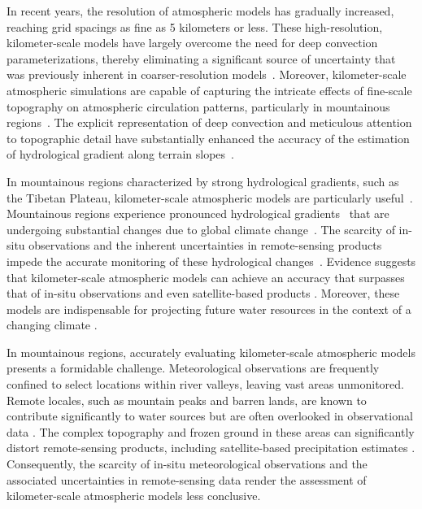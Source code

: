 \documentclass[draft]{agujournal2019}
\begin{document}
In recent years, the resolution of atmospheric models has gradually increased, reaching grid spacings as fine as 5 kilometers or less. These high-resolution, kilometer-scale models have largely overcome the need for deep convection parameterizations, thereby eliminating a significant source of uncertainty that was previously inherent in coarser-resolution models~\cite{prein2015RG, mooney2017JC}. Moreover, kilometer-scale atmospheric simulations are capable of capturing the intricate effects of fine-scale topography on atmospheric circulation patterns, particularly in mountainous regions~\cite{lin2018CD, zhou2021CD, yuan2023AR, sugimoto2021JHM, ma2023CD, li2022AAS}. The explicit representation of deep convection and meticulous attention to topographic detail have substantially enhanced the accuracy of the estimation of hydrological gradient along terrain slopes~\cite{jiang2022HESS, sugimoto2021JHM, ma2023CD}.

In mountainous regions characterized by strong hydrological gradients, such as the Tibetan Plateau, kilometer-scale atmospheric models are particularly useful~\cite{prein2023CD}. Mountainous regions experience pronounced hydrological gradients~\cite{immerzeel2014WRR} that are undergoing substantial changes due to global climate change~\cite{yao2019BAMS, cui2023NC, wang2021NCC, kraaijenbrink2021NCC}. The scarcity of in-situ observations and the inherent uncertainties in remote-sensing products impede the accurate monitoring of these hydrological changes~\cite{miao2024PNAS}. Evidence suggests that kilometer-scale atmospheric models can achieve an accuracy that surpasses that of in-situ observations \cite{lundquist2019BAMS} and even satellite-based products \cite{jiang2022IJC}. Moreover, these models are indispensable for projecting future water resources in the context of a changing climate \cite{prein2023CD}.

In mountainous regions, accurately evaluating kilometer-scale atmospheric models presents a formidable challenge. Meteorological observations are frequently confined to select locations within river valleys, leaving vast areas unmonitored. Remote locales, such as mountain peaks and barren lands, are known to contribute significantly to water sources but are often overlooked in observational data \cite{miao2024PNAS}. The complex topography and frozen ground in these areas can significantly distort remote-sensing products, including satellite-based precipitation estimates \cite{behrangi2014JAMC}. Consequently, the scarcity of in-situ meteorological observations and the associated uncertainties in remote-sensing data render the assessment of kilometer-scale atmospheric models less conclusive.
\end{document}

